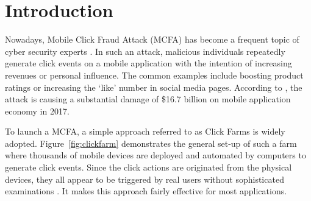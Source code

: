\documentclass[conference]{IEEEtranl}
\begin{document}
\begin{abstract}
	\end{abstract}
	\section{Introduction}
	Nowadays, Mobile Click Fraud Attack (MCFA) has become a frequent topic of cyber security experts \cite{clickfraid1}. In such an attack, 
	malicious individuals repeatedly generate click events on a mobile application with the intention of increasing revenues or personal influence. The common examples include boosting product ratings or increasing the `like' number in social media pages. According to \cite{losingbattle}, the attack is causing a substantial damage of  \$16.7 billion on mobile application economy in 2017.

	To launch a MCFA, a simple approach referred to as Click Farms \cite{clickfarm} is widely adopted.
	Figure~\ref{fig:clickfarm} demonstrates the general set-up of such a farm where thousands of mobile devices are deployed and automated by computers to generate click events. 
	Since the click actions are originated from the physical devices, they all appear to be triggered by real users without sophisticated examinations \cite{cho2015empirical}. It makes this approach fairly effective for most applications.
\end{document}

